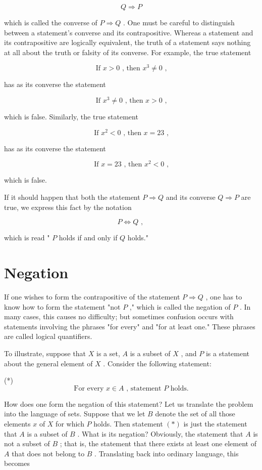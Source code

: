 \documentclass[10pt]{article}
\begin{document}
\[
Q \Rightarrow  P
\]

which is called the converse of \(P \Rightarrow  Q\) . One must be careful to distinguish between a statement's converse and its contrapositive. Whereas a statement and its contrapositive are logically equivalent, the truth of a statement says nothing at all about the truth or falsity of its converse. For example, the true statement

\[
\text{ If }x > 0\text{ , then }{x}^{3} \neq  0\text{ , }
\]

has as its converse the statement

\[
\text{ If }{x}^{3} \neq  0\text{ , then }x > 0\text{ , }
\]

which is false. Similarly, the true statement

\[
\text{ If }{x}^{2} < 0\text{ , then }x = {23}\text{ , }
\]

has as its converse the statement

\[
\text{ If }x = {23}\text{ , then }{x}^{2} < 0\text{ , }
\]

which is false.

If it should happen that both the statement \(P \Rightarrow  Q\) and its converse \(Q \Rightarrow  P\) are true, we express this fact by the notation

\[
P \Leftrightarrow  Q\text{ , }
\]

which is read " \(P\) holds if and only if \(Q\) holds."

\section*{Negation}

If one wishes to form the contrapositive of the statement \(P \Rightarrow  Q\) , one has to know how to form the statement "not \(P\) ," which is called the negation of \(P\) . In many cases, this causes no difficulty; but sometimes confusion occurs with statements involving the phrases "for every" and "for at least one." These phrases are called logical quantifiers.

To illustrate, suppose that \(X\) is a set, \(A\) is a subset of \(X\) , and \(P\) is a statement about the general element of \(X\) . Consider the following statement:

(*)
\[
\text{ For every }x \in  A\text{ , statement }P\text{ holds. }
\]

How does one form the negation of this statement? Let us translate the problem into the language of sets. Suppose that we let \(B\) denote the set of all those elements \(x\) of \(X\) for which \(P\) holds. Then statement \(\left( *\right)\) is just the statement that \(A\) is a subset of \(B\) . What is its negation? Obviously, the statement that \(A\) is not a subset of \(B\) ; that is, the statement that there exists at least one element of \(A\) that does not belong to \(B\) . Translating back into ordinary language, this becomes
\end{document}
